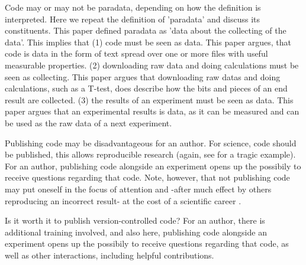 
Code may or may not be paradata, depending on how the definition
is interpreted.
Here we repeat the definition of 'paradata' and discuss 
its constituents.
This paper defined paradata as 'data about the collecting of the data'.
This implies that (1) code must be seen as data.
This paper argues, that code is data in the form of text spread
over one or more files with useful measurable properties.
(2) downloading raw data and doing calculations must be seen as collecting.
This paper argues that downloading raw datas and doing calculations, 
such as a T-test,
does describe how the bits and pieces of an end result are collected.
(3) the results of an experiment must be seen as data.
This paper argues that an experimental results is data, 
as it can be measured and can be used as the raw data of a next experiment.


Publishing code may be disadvantageous for an author.
For science, code should be published, 
this allows reproducible research 
(again, see \cite{haibe2020importance} for a tragic example).
For an author, publishing code alongside an experiment opens up
the possibily to receive questions regarding that code.
Note, however, that not publishing code may put 
oneself in the focus of attention
and -after much effect by others reproducing an incorrect result-
at the cost of a scientific career \cite{baggerly2009deriving}.


Is it worth it to publish version-controlled code?
For an author, 
there is additional training involved, and also here,
publishing code alongside an experiment opens up
the possibily to receive questions regarding that code,
as well as other interactions, including helpful contributions.

